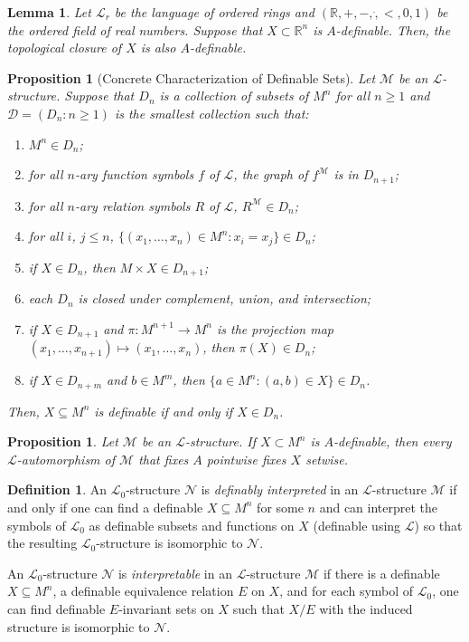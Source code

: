 \documentclass{amsart}
\newtheorem{lemma}[theorem]{Lemma}
\newtheorem{proposition}[theorem]{Proposition}
\theoremstyle{definition}
\newtheorem{definition}[theorem]{Definition}
\numberwithin{equation}{section}
\begin{document}
\begin{lemma}
    Let $\mathcal{L}_r$ be the language of ordered rings and 
    $(\mathbb{R}, +, -, \dot, <, 0, 1)$ be the ordered field of real numbers.
    Suppose that $X \subset \mathbb{R}^n$ is $A$-definable.
    Then, the topological closure of $X$ is also $A$-definable.
\end{lemma}

\begin{proposition}[Concrete Characterization of Definable Sets]
    Let $\mathcal{M}$ be an $\mathcal{L}$-structure.
    Suppose that $D_n$ is a collection of subsets of $M^n$ for all $n \ge 1$ and 
    $\mathcal{D} = (D_n : n \ge 1)$ is the smallest collection such that:
    \begin{enumerate}[label = {\roman*)}]
        \item $M^n \in D_n$;
        \item for all $n$-ary function symbols $f$ of $\mathcal{L}$, the graph of $f^{\mathcal{M}}$ is in $D_{n+1}$;
        \item for all $n$-ary relation symbols $R$ of $\mathcal{L}$, $R^{\mathcal{M}} \in D_n$;
        \item for all $i$, $j\le n$, $\{(x_1,\dots,x_n)\in M^n : x_i = x_j\} \in D_n$;
        \item if $X \in D_n$, then $M \times X \in D_{n+1}$;
        \item each $D_n$ is closed under complement, union, and intersection;
        \item if $X \in D_{n+1}$ and $\pi: M^{n+1} \to M^n$ is the projection map $(x_1,\dots,x_{n+1}) \mapsto (x_1,\dots,x_n)$, then $\pi(X) \in D_n$;
        \item if $X \in D_{n+m}$ and $b \in M^m$, then $\{a\in M^n: (a,b) \in X \} \in D_n$.
    \end{enumerate}
    Then, $X \subseteq M^n$ is definable if and only if $X \in D_n$.
\end{proposition}

\begin{proposition}
    Let $\mathcal{M}$ be an $\mathcal{L}$-structure.
    If $X \subset M^n$ is $A$-definable,
    then every $\mathcal{L}$-automorphism of $\mathcal{M}$ that fixes $A$ pointwise fixes $X$ setwise.
\end{proposition}

\begin{definition}
    An $\mathcal{L}_0$-structure $\mathcal{N}$ is \emph{definably interpreted} in an $\mathcal{L}$-structure $\mathcal{M}$ 
    if and only if one can find a definable $X \subseteq M^n$ for some $n$ and can interpret the symbols of $\mathcal{L}_0$ as definable subsets and functions on $X$ (definable using $\mathcal{L}$) so that the resulting $\mathcal{L}_0$-structure is isomorphic to $\mathcal{N}$.

    An $\mathcal{L}_0$-structure $\mathcal{N}$ is \emph{interpretable} in an $\mathcal{L}$-structure $\mathcal{M}$ if there is a definable $X \subseteq M^n$, a definable equivalence relation $E$ on $X$,
    and for each symbol of $\mathcal{L}_0$, one can find definable $E$-invariant sets on $X$ such that $X / E$ with the induced structure is isomorphic to $\mathcal{N}$.
\end{definition}
\end{document}

